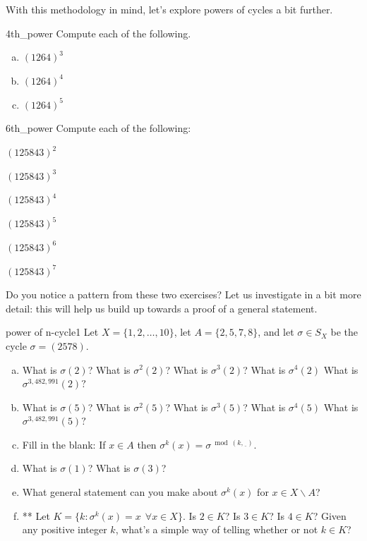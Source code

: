 \noindent
With this methodology in mind, let's  explore powers of cycles a bit further.

\begin{exercise}{4th_power}
Compute each of the following.
\begin{multicols}{3}
\begin{enumerate}[(a)]
\item
$(1 2 6 4)^3$
\item
$(1 2 6 4)^4$
\item
$(1 2 6 4)^5$
\end{enumerate}
\end{multicols}
\end{exercise}

\begin{exercise}{6th_power}
Compute each of the following:
\begin{enumerate}[(a)]
\begin{multicols}{3}
\item
$(1 2 5 8 4 3)^2$
\item
$(1 2 5 8 4 3)^3$
\item
$(1 2 5 8 4 3)^4$
\item
$(1 2 5 8 4 3)^5$
\item
$(1 2 5 8 4 3)^6$
\item
$(1 2 5 8 4 3)^7$
\end{multicols}
\end{enumerate}
\end{exercise}

\noindent
Do you notice a pattern from these two exercises?  Let us investigate in a bit more detail: this will help us build up towards a proof of a general statement.

\begin{exercise}{power of n-cycle1}
Let $X = \{1,2,\ldots,10\}$, let $A = \{2,5,7,8\}$, and let $\sigma \in S_X$ be the cycle  $\sigma = ( 2 5 7 8 )$. \begin{enumerate}[(a)]
\item
What is $\sigma(2)$? What is $\sigma^2(2)$? What is $\sigma^3(2)$? What is $\sigma^4(2)$ What is $\sigma^{3,482,991}(2)?$  
\item
What is $\sigma(5)$? What is $\sigma^2(5)$? What is $\sigma^3(5)$? What is $\sigma^4(5)$ What is $\sigma^{3,482,991}(5)?$  
\item
Fill in the blank: If $x \in A$ then $\sigma^k(x) = \sigma^{\bmod(k,\underline{~~})}$.
\item
What is $\sigma(1)$? What is $\sigma(3)$? 
\item
What general statement can you make about $\sigma^k(x)$ for $x \in X \backslash A$?
\item ** Let $K = \{k: \sigma^k(x) = x ~~\forall x \in X\}$. Is $2 \in K$?   Is $3 \in K$? Is $4 \in K$? Given any positive integer $k$, what's a simple way of telling whether or not $k \in K$?
\end{enumerate}
\end{exercise}

